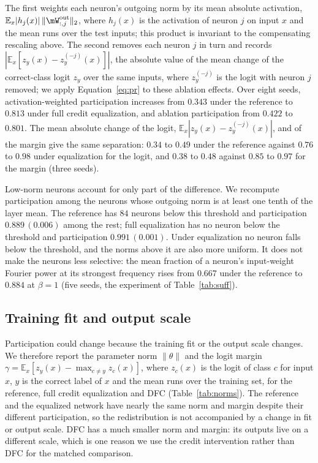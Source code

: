\documentclass{article} %
\begin{document}
The first weights each neuron's outgoing norm by its mean absolute activation, $\mathbb{E}_x|h_j(x)| \, \|\mW^{\mathrm{out}}_{:,j}\|_2$, where $h_j(x)$ is the activation of neuron $j$ on input $x$ and the mean runs over the test inputs; this product is invariant to the compensating rescaling above. The second removes each neuron $j$ in turn and records $|\mathbb{E}_x[z_y(x) - z_y^{(-j)}(x)]|$, the absolute value of the mean change of the correct-class logit $z_y$ over the same inputs, where $z_y^{(-j)}$ is the logit with neuron $j$ removed; we apply Equation~\ref{eq:pr} to these ablation effects. Over eight seeds, activation-weighted participation increases from $0.343$ under the reference to $0.813$ under full credit equalization, and ablation participation from $0.422$ to $0.801$. The mean absolute change of the logit, $\mathbb{E}_x|z_y(x) - z_y^{(-j)}(x)|$, and of the margin give the same separation: $0.34$ to $0.49$ under the reference against $0.76$ to $0.98$ under equalization for the logit, and $0.38$ to $0.48$ against $0.85$ to $0.97$ for the margin (three seeds).

Low-norm neurons account for only part of the difference. We recompute participation among the neurons whose outgoing norm is at least one tenth of the layer mean. The reference has $84$ neurons below this threshold and participation $0.889\,(0.006)$ among the rest; full equalization has no neuron below the threshold and participation $0.991\,(0.001)$. Under equalization no neuron falls below the threshold, and the norms above it are also more uniform. It does not make the neurons less selective: the mean fraction of a neuron's input-weight Fourier power at its strongest frequency rises from $0.667$ under the reference to $0.884$ at $\beta = 1$ (five seeds, the experiment of Table~\ref{tab:suff}).

\subsection{Training fit and output scale}
\label{app:norm}
Participation could change because the training fit or the output scale changes. We therefore report the parameter norm $\|\theta\|$ and the logit margin $\gamma = \mathbb{E}_x[z_y(x) - \max_{c \neq y} z_c(x)]$, where $z_c(x)$ is the logit of class $c$ for input $x$, $y$ is the correct label of $x$ and the mean runs over the training set, for the reference, full credit equalization and DFC (Table~\ref{tab:norms}). The reference and the equalized network have nearly the same norm and margin despite their different participation, so the redistribution is not accompanied by a change in fit or output scale. DFC has a much smaller norm and margin: its outputs live on a different scale, which is one reason we use the credit intervention rather than DFC for the matched comparison.
\end{document}
